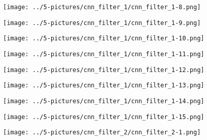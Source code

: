 \documentclass[11pt]{beamer}
\begin{document}
\begin{frame}
	\begin{center}
	\texttt{[image: ../5-pictures/cnn\_filter\_1/cnn\_filter\_1-8.png]}
	\end{center}
\end{frame}
\begin{frame}
	\begin{center}
	\texttt{[image: ../5-pictures/cnn\_filter\_1/cnn\_filter\_1-9.png]}
	\end{center}
\end{frame}
\begin{frame}
	\begin{center}
	\texttt{[image: ../5-pictures/cnn\_filter\_1/cnn\_filter\_1-10.png]}
	\end{center}
\end{frame}
\begin{frame}
	\begin{center}
	\texttt{[image: ../5-pictures/cnn\_filter\_1/cnn\_filter\_1-11.png]}
	\end{center}
\end{frame}
\begin{frame}
	\begin{center}
	\texttt{[image: ../5-pictures/cnn\_filter\_1/cnn\_filter\_1-12.png]}
	\end{center}
\end{frame}
\begin{frame}
	\begin{center}
	\texttt{[image: ../5-pictures/cnn\_filter\_1/cnn\_filter\_1-13.png]}
	\end{center}
\end{frame}
\begin{frame}
	\begin{center}
	\texttt{[image: ../5-pictures/cnn\_filter\_1/cnn\_filter\_1-14.png]}
	\end{center}
\end{frame}
\begin{frame}
	\begin{center}
	\texttt{[image: ../5-pictures/cnn\_filter\_1/cnn\_filter\_1-15.png]}
	\end{center}
\end{frame}
\begin{frame}
	\begin{center}
	\texttt{[image: ../5-pictures/cnn\_filter\_2/cnn\_filter\_2-1.png]}
	\end{center}
\end{frame}
\end{document}
